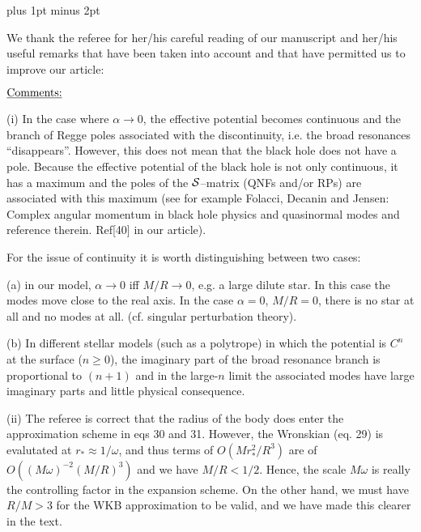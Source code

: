  \baselineskip=12pt plus 1pt minus 2pt
\nopagenumbers



\smallskip
{}

\smallskip
{}




\bigskip
\bigskip

We thank the referee for her/his careful reading of our manuscript and her/his useful remarks that have been taken into account and that have permitted us to improve our article:


\bigskip

\noindent $\underline{\hbox{Comments:}} $
\medskip


\bigskip
(i) In the case where $\alpha \rightarrow0$, the effective potential becomes continuous and the branch of Regge poles associated with the discontinuity, i.e. the broad resonances ``disappears''. However, this does not mean that the black hole does not have a pole. Because the effective potential of the black hole is not only continuous, it has a maximum and the poles of the $\cal{S}$--matrix (QNFs and/or RPs) are associated with this maximum (see for example Folacci, Decanin and Jensen: Complex angular momentum in black hole physics and quasinormal modes and reference therein. Ref[40] in our article). 

\bigskip 
For the issue of continuity it is worth distinguishing between two cases: \bigskip

\qquad  (a)  in our model, $\alpha \rightarrow 0$ iff $M/R \rightarrow 0$, e.g. a large dilute star. In this case the modes move close to the real axis.
In the case $\alpha = 0$, $M/R = 0$, there is no star at all and no modes at all. (cf. singular perturbation theory).

\bigskip

 \qquad (b) In different stellar models (such as a polytrope) in which the potential is $C^n$ at the surface ($n \geq 0$), the imaginary part of the broad resonance branch is proportional to $(n+1)$ and in the large-$n$ limit the associated modes have large imaginary parts and little physical consequence.




\bigskip
\bigskip
(ii) The referee is correct that the radius of the body does enter the approximation scheme in eqs 30 and 31. However, the Wronskian (eq. 29) is evalutated at  $r_{*} \approx 1/\omega$, and thus terms of  $O(M r_{*}^2 / R^3  )$ are of  $ O \left(  (M \omega)^{-2} (M/R)^3 \right) $ and we have $M/R< 1/2$. Hence, the  scale $M \omega$ is really the controlling factor in the expansion scheme. On the other hand, we must have $R/M>3$ for the WKB approximation to be valid, and we have made this clearer in the text. 


